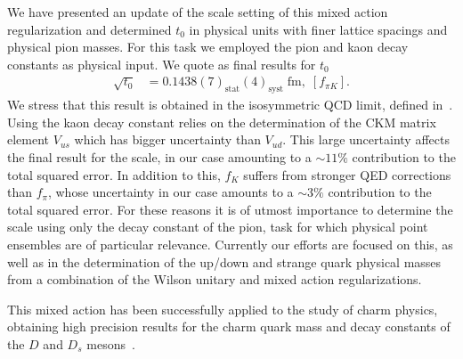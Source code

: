 We have presented an update of the scale setting of this mixed action regularization and determined $t_0$ in physical units with finer lattice spacings and physical pion masses. For this task we employed the pion and kaon decay constants as physical input. We quote as final results for $t_0$
\begin{align}
\sqrt{t_0}&=0.1438(7)_{\textrm{stat}}(4)_{\textrm{syst}}\;\textrm{fm},\;[f_{\pi K}].
\end{align}
We stress that this result is obtained in the isosymmetric QCD limit, defined in~\citep{FlavourLatticeAveragingGroupFLAG:2021npn}. Using the kaon decay constant relies on the determination of the CKM matrix element $V_{us}$ which has bigger uncertainty than $V_{ud}$. This large uncertainty affects the final result for the scale, in our case amounting to a $\sim11\%$ contribution to the total squared error. In addition to this, $f_K$ suffers from stronger QED corrections than $f_{\pi}$, whose uncertainty in our case amounts to a $\sim3\%$ contribution to the total squared error. For these reasons it is of utmost importance to determine the scale using only the decay constant of the pion, task for which physical point ensembles are of particular relevance. Currently our efforts are focused on this, as well as in the determination of the up/down and strange quark physical masses from a combination of the Wilson unitary and mixed action regularizations.

This mixed action has been successfully applied to the study of charm physics, obtaining high precision results for the charm quark mass and decay constants of the $D$ and $D_s$ mesons~\citep{charm}.

